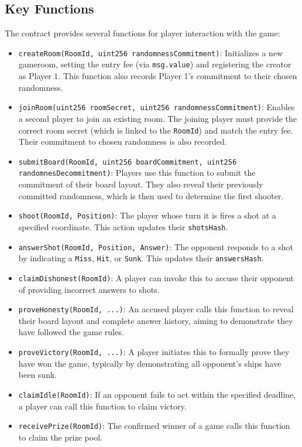 \documentclass{article}
\begin{document}
    \subsection{Key Functions}
    The contract provides several functions for player interaction with the game:
    \begin{itemize}
        \item \texttt{createRoom(RoomId, uint256 randomnessCommitment)}: Initializes a new game\break room, setting the entry fee (via \texttt{msg.value}) and registering the creator as Player 1. This function also records Player 1's commitment to their chosen randomness.
        \item \texttt{joinRoom(uint256 roomSecret, uint256 randomnessCommitment)}: Enables a second player to join an existing room. The joining player must provide the correct room secret (which is linked to the \texttt{RoomId}) and match the entry fee. Their commitment to chosen randomness is also recorded.
        \item \texttt{submitBoard(RoomId, uint256 boardCommitment, uint256 randomnesDecommit\-ment)}: Players use this function to submit the commitment of their board layout. They also reveal their previously committed randomness, which is then used to determine the first shooter.
        \item \texttt{shoot(RoomId, Position)}: The player whose turn it is fires a shot at a specified coordinate. This action updates their \texttt{shotsHash}.
        \item \texttt{answerShot(RoomId, Position, Answer)}: The opponent responds to a shot by indicating a \texttt{Miss}, \texttt{Hit}, or \texttt{Sunk}. This updates their \texttt{answersHash}.
        \item \texttt{claimDishonest(RoomId)}: A player can invoke this to accuse their opponent of providing incorrect answers to shots.
        \item \texttt{proveHonesty(RoomId, ...)}: An accused player calls this function to reveal their board layout and complete answer history, aiming to demonstrate they have followed the game rules.
        \item \texttt{proveVictory(RoomId, ...)}: A player initiates this to formally prove they have won the game, typically by demonstrating all opponent's ships have been sunk.
        \item \texttt{claimIdle(RoomId)}: If an opponent fails to act within the specified deadline, a player can call this function to claim victory.
        \item \texttt{receivePrize(RoomId)}: The confirmed winner of a game calls this function to claim the prize pool.
    \end{itemize}
\end{document}
